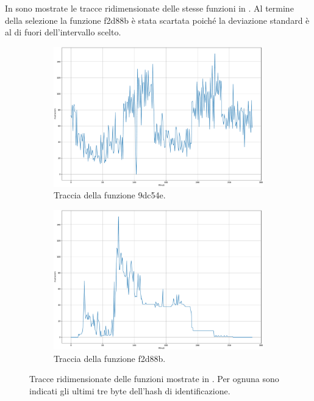 In  sono mostrate le tracce ridimensionate delle stesse funzioni in . Al termine della selezione la funzione f2d88b è stata scartata poiché la deviazione standard è al di fuori dell'intervallo scelto.

\begin{figure}
    \centering

    \begin{subfigure}{.95\textwidth}
        \centering
        \includegraphics[width=\linewidth]{assets/5/requests_9dc54e_scaled.pdf}
        \caption{Traccia della funzione 9dc54e.}
        \label{fig:5_real_traces_scaled_9dc54e}
    \end{subfigure}

    \begin{subfigure}{.95\textwidth}
        \centering
        \includegraphics[width=\linewidth]{assets/5/requests_f2d88b_scaled.pdf}
        \caption{Traccia della funzione f2d88b.}
        \label{fig:5_real_traces_scaled_f2d88b}
    \end{subfigure}
    
    \caption[Tracce ridimensionate delle funzioni mostrate in ]{Tracce ridimensionate delle funzioni mostrate in . Per ognuna sono indicati gli ultimi tre byte dell'hash di identificazione.}
    \label{fig:5_real_traces_scaled}
\end{figure}

